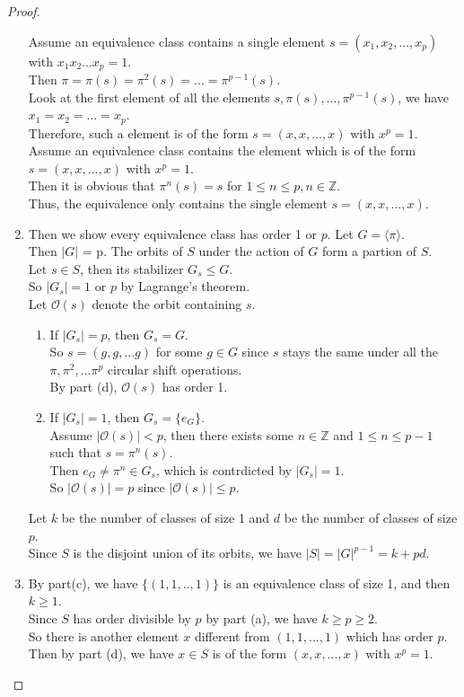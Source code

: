 \documentclass[14pt]{amsart}
\newcommand{\llo}{\mathcal{O}}
\newcommand{\bbz}{\mathbb{Z}}
\theoremstyle{plain}
\theoremstyle{definition}
\begin{document}
\begin{proof}
\begin{enumerate}
	  Assume an equivalence class contains a single element $s=(x_1,x_2,...,x_p)$ with $x_1x_2...x_p=1$.\\
	  Then $\pi= \pi(s) = \pi^2(s) = ...=\pi^{p-1}(s)$.\\
	  Look at the first element of all the elements $s,\pi(s),...,\pi^{p-1}(s)$, we have $x_1=x_2=...=x_p$.\\
	  Therefore, such a element is of the form $s=(x,x,...,x)$ with $x^p = 1$.\\
	  Assume an equivalence class contains the element which is of the form $s=(x,x,...,x)$ with $x^p=1$.\\
	  Then it is obvious that $\pi^n(s) = s$ for $1 \leq n \leq p, n\in \bbz$.\\
	  Thus, the equivalence only contains the single element $s = (x,x,...,x)$.
	\item
	   Then we show every equivalence class has order 1 or $p$.
		Let $G = \langle \pi \rangle$.\\
		Then $|G|$ = p.
	  	The orbits of $S$ under the action of $G$ form a partion of $S$.\\
	  	Let $s\in S$, then its stabilizer $G_s \leq G$.\\
	  	So $|G_s| = 1$ or $p$ by Lagrange's theorem.\\
	  	Let $\llo(s)$ denote the orbit containing $s$.
	  	\begin{enumerate}
	  		\item
	  		  If $|G_s|= p$, then $G_s = G$. \\
	  		  So $s = (g,g,...g)$ for some $g \in G$ since $s$ stays the same under all the $\pi,\pi^2,...\pi^p$ circular shift operations.\\
	  		  By part (d), $\llo(s)$ has order 1.
	  		  \item
	  		  	If $|G_s|= 1$, then $G_s = \{e_G\}$. \\
	  		  	Assume $|\llo(s)| < p$, then there exists some $n \in \bbz$ and $1 \leq n \leq p-1$ such that $s = \pi^n(s)$.\\
	  		  	Then $e_G \neq \pi^n \in G_s$, which is contrdicted by $|G_s| = 1$.\\
	  		  	So $|\llo(s)| = p$ since $|\llo(s)| \leq p$.
		\end{enumerate}
	 Let $k$ be the number of classes of size 1 and $d$ be the number of classes of size $p$.\\
	 Since $S$ is the disjoint union of its orbits, we have $|S| = |G|^{p-1} = k+pd$.
	\item 
	By part(c), we have $\{(1,1,..,1)\}$ is an equivalence class of size 1, and then $k \geq 1$.\\
	Since $S$ has order divisible by $p$ by part (a), we have $k \geq p \geq 2$.\\
	So there is another element $x$ different from $(1,1,...,1)$ which has order $p$.\\
	Then by part (d), we have $x\in S$ is of the form $(x,x,...,x)$ with $x^p = 1$.
  \end{enumerate}
\end{proof}
\end{document}

